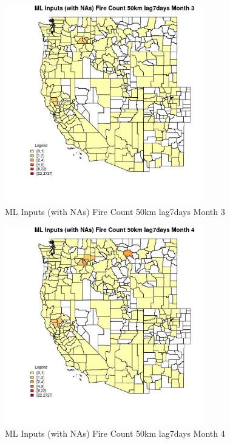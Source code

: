 \clearpage 

\begin{figure} 
\centering  
\includegraphics[width=0.77\textwidth]{Code_Outputs/Report_ML_input_PM25_Step4_part_f_de_duplicated_aveswNAs_CountyFire_Count_50km_lag7daysmedianMonth3.jpg} 
\caption{\label{fig:Report_ML_input_PM25_Step4_part_f_de_duplicated_aveswNAsCountyFire_Count_50km_lag7daysmedianMonth3}ML Inputs (with NAs) Fire Count 50km lag7days Month 3} 
\end{figure} 
 

\begin{figure} 
\centering  
\includegraphics[width=0.77\textwidth]{Code_Outputs/Report_ML_input_PM25_Step4_part_f_de_duplicated_aveswNAs_CountyFire_Count_50km_lag7daysmedianMonth4.jpg} 
\caption{\label{fig:Report_ML_input_PM25_Step4_part_f_de_duplicated_aveswNAsCountyFire_Count_50km_lag7daysmedianMonth4}ML Inputs (with NAs) Fire Count 50km lag7days Month 4} 
\end{figure} 
 

